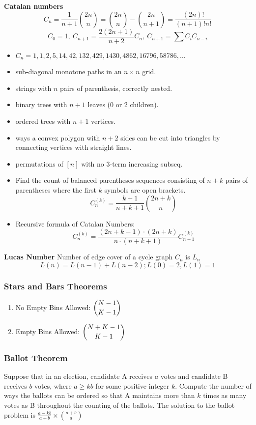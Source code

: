 \textbf{Catalan numbers}
\[ C_n=\frac{1}{n+1}\binom{2n}{n}= \binom{2n}{n}-\binom{2n}{n+1} = \frac{(2n)!}{(n+1)!n!} \]
\[ C_0=1,\ C_{n+1} = \frac{2(2n+1)}{n+2}C_n,\ C_{n+1}=\sum C_iC_{n-i} \]
\begin{itemize}[noitemsep]
\item $C_n = 1, 1, 2, 5, 14, 42, 132, 429, 1430, 4862, 16796, 58786, \dots$
\item sub-diagonal monotone paths in an $n\times n$ grid.
\item strings with $n$ pairs of parenthesis, correctly nested.
\item binary trees with $n+1$ leaves (0 or 2 children).
\item ordered trees with $n+1$ vertices.
\item ways a convex polygon with $n+2$ sides can be cut into triangles by connecting vertices with straight lines.
\item permutations of $[n]$ with no 3-term increasing subseq.
\item Find the count of balanced parentheses sequences consisting of $n + k$ pairs of parentheses where the first $k$ symbols are open brackets.
  $$C_n^{(k)} = \frac{k + 1}{n + k + 1} \binom{2n + k}{n}$$
\item Recursive formula of Catalan Numbers:
  $$ C_{n}^{(k)} = \frac{(2n + k - 1) \cdot (2n + k)}{n \cdot (n + k + 1)} C_{n - 1}^{(k)} $$
\end{itemize}

\textbf{Lucas Number}
Number of edge cover of a cycle graph $ C_n $ is $ L_n $
$$ L(n) = L(n-1) + L(n-2); L(0)=2, L(1)=1 $$

\subsubsection{Stars and Bars Theorems}
\begin{enumerate}
  \item No Empty Bins Allowed: $\dbinom{N - 1}{K - 1}$
  \item Empty Bins Allowed: $\dbinom{N + K - 1}{K - 1}$
\end{enumerate}

\subsubsection{Ballot Theorem}
Suppose that in an election, candidate A receives $a$ votes and candidate B receives $b$ votes, where $a \ge kb$ for some positive integer $k$. Compute the number of ways the ballots can be ordered so that A maintains more than $k$ times as many votes as B throughout the counting of the ballots.
The solution to the ballot problem is $\frac{a - kb}{a+b} \times \binom{a + b}{a}$

